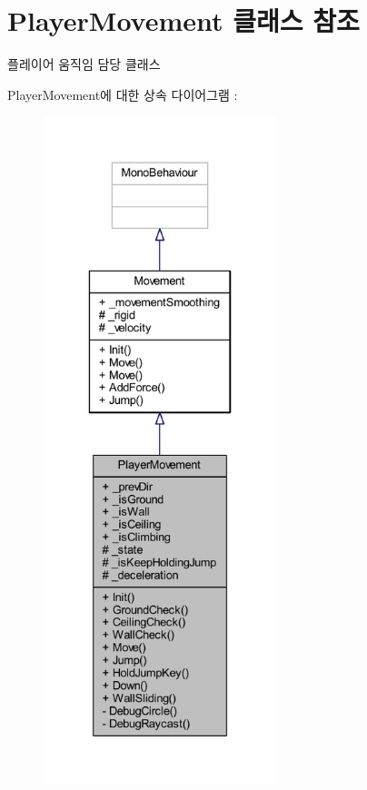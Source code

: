 \hypertarget{class_player_movement}{}\section{Player\+Movement 클래스 참조}
\label{class_player_movement}


플레이어 움직임 담당 클래스  




Player\+Movement에 대한 상속 다이어그램 \+: 
\nopagebreak
\begin{figure}[H]
\begin{center}
\leavevmode
\includegraphics[height=550pt]{de/d46/class_player_movement__inherit__graph}
\end{center}
\end{figure}



